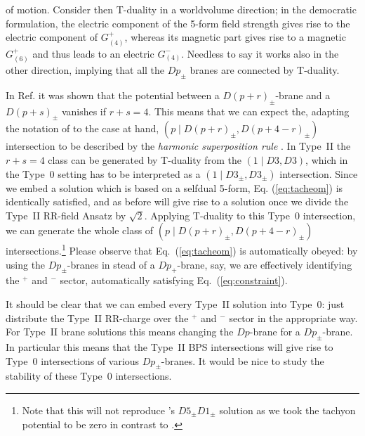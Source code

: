 \documentclass[12pt,a4paper]{article}
\begin{document}
of motion.  Consider then T-duality in a worldvolume direction; in the
democratic formulation, the electric component of the 5-form field
strength gives rise to the electric component of $G_{(4)}^{+}$,
whereas its magnetic part gives rise to a magnetic $G_{(6)}^{+}$ and
thus leads to an electric $G_{(4)}^{-}$. Needless to say it works also
in the other direction, implying that all the $Dp_{\pm}$ branes are
connected by T-duality.
\par
In Ref. \cite{kn:costa} it was shown that the potential between a
$D(p+r)_{\pm}$-brane and a $D(p+s)_{\pm}$ vanishes if $r+s=4$.  This
means that we can expect the, adapting the notation of
\cite{kn:BdREJvdS} to the case at hand, $\left( p\mid
  D(p+r)_{\pm},D(p+4-r)_{\pm}\right)$ intersection to be described by
the {\it harmonic superposition rule} \cite{kn:Ts-M}.  In Type~II the
$r+s=4$ class can be generated by T-duality from the $\left( 1\mid
  D3,D3\right)$, which in the Type~0 setting has to be interpreted as
a $\left( 1\mid D3_{\pm},D3_{\pm}\right)$ intersection.  Since we
embed a solution which is based on a selfdual 5-form, Eq.
(\ref{eq:tacheom}) is identically satisfied, and as before will give
rise to a solution once we divide the Type~II RR-field Ansatz by
$\sqrt{2}$.  Applying T-duality to this Type~0 intersection, we can
generate the whole class of $\left( p\mid
  D(p+r)_{\pm},D(p+4-r)_{\pm}\right)$ intersections.\footnote{Note
  that this will not reproduce \cite{kn:costa}'s $D5_{\pm}D1_{\pm}$
  solution as we took the tachyon potential to be zero in contrast to
  \cite{kn:costa}.}  Please observe that Eq.~(\ref{eq:tacheom}) is
automatically obeyed: by using the $Dp_{\pm}$-branes in stead of a
$Dp_{+}$-brane, say, we are effectively identifying the $^{+}$ and
$^{-}$ sector, automatically satisfying Eq.~(\ref{eq:constraint}).
\par
It should be clear that we can embed every Type~II solution into
Type~0: just distribute the Type~II RR-charge over the $^{+}$ and
$^{-}$ sector in the appropriate way.  {}For Type~II brane solutions
this means changing the $Dp$-brane for a $Dp_{\pm}$-brane.  In
particular this means that the Type~II BPS intersections will give
rise to Type~0 intersections of various $Dp_{\pm}$-branes.  It would
be nice to study the stability of these Type~0 intersections.
\end{document}
